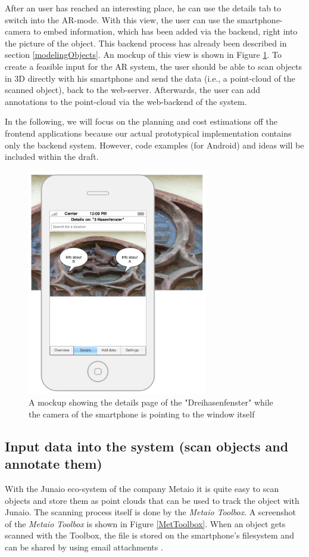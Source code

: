 After an user has reached an interesting place, he can use the details tab to switch into the \ac{AR}-mode. With this view, the user can use the smartphone-camera to embed information, which has been added via the backend, right into the picture of the object. This backend process has already been described in section \ref{modelingObjects}. An mockup of this view is shown in Figure \ref{app2}. 
To create a feasible input for the \ac{AR} system, the user should be able to scan objects in 3D directly with his smartphone and send the data (i.e., a point-cloud of the scanned object), back to the web-server.  Afterwards, the user can add annotations to the point-cloud via the web-backend of the system. 

In the following, we will focus on the planning and cost estimations off the frontend applications because our actual prototypical implementation contains only the backend system.  However, code examples (for Android) and ideas will be included within the draft. 

\begin{figure}[th]
	\centerline{\includegraphics[width=0.7\textwidth]{gfx/mockup_app_2}}
	\caption{A mockup showing the details page of the "Dreihasenfenster" while the camera of the smartphone is pointing to the window itself}
	\label{app2}
\end{figure}			
  
\subsection{Input data into the system (scan objects and annotate them)} 
With the Junaio eco-system of the company Metaio it is quite easy to scan objects and store them as point clouds that can be used to track the object with Junaio. The scanning process itself is done by the \emph{Metaio Toolbox}. A screenshot of the \emph{Metaio Toolbox} is shown in Figure \ref{MetToolbox}. When an object gets scanned with the Toolbox, the file is stored on the smartphone's filesystem and can be shared by using email attachments .

